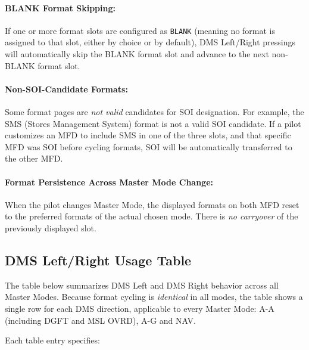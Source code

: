 \documentclass[11pt, a4paper, twoside]{report}
\begin{document}
\paragraph{BLANK Format Skipping:}

If one or more format slots are configured as \texttt{BLANK} (meaning no format is assigned to that slot, either by choice or by default), DMS Left/Right pressings will automatically skip the BLANK format slot and advance to the next non-BLANK format slot.

\paragraph{Non-SOI-Candidate Formats:}

Some format pages are \textit{not valid} candidates for SOI designation. For example, the SMS (Stores Management System) format is not a valid SOI candidate. If a pilot customizes an MFD to include SMS in one of the three slots, and that specific MFD was SOI before cycling formats, SOI will be automatically transferred to the other MFD.

\paragraph{Format Persistence Across Master Mode Change:}

When the pilot changes Master Mode, the displayed formats on both MFD reset to the preferred formats of the actual chosen mode. There is \textit{no carryover} of the previously displayed slot.


\subsection{DMS Left/Right Usage Table}
\label{sec:C4-S4-S3}

The table below summarizes DMS Left and DMS Right behavior across all Master Modes. Because format cycling is \textit{identical} in all modes, the table shows a single row for each DMS direction, applicable to every Master Mode: A-A (including DGFT and MSL OVRD), A-G and NAV.

Each table entry specifies:
\end{document}
